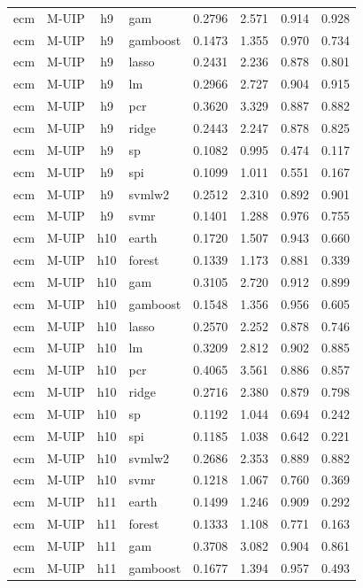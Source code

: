 \begin{ThreePartTable}
\begin{longtable}[t]{llclcccc}
ecm & M-UIP & h9 & gam & 0.2796 & 2.571 & 0.914 & 0.928\\
ecm & M-UIP & h9 & gamboost & 0.1473 & 1.355 & 0.970 & 0.734\\
ecm & M-UIP & h9 & lasso & 0.2431 & 2.236 & 0.878 & 0.801\\
ecm & M-UIP & h9 & lm & 0.2966 & 2.727 & 0.904 & 0.915\\
ecm & M-UIP & h9 & pcr & 0.3620 & 3.329 & 0.887 & 0.882\\
ecm & M-UIP & h9 & ridge & 0.2443 & 2.247 & 0.878 & 0.825\\
ecm & M-UIP & h9 & sp & 0.1082 & 0.995 & 0.474 & 0.117\\
ecm & M-UIP & h9 & spi & 0.1099 & 1.011 & 0.551 & 0.167\\
ecm & M-UIP & h9 & svmlw2 & 0.2512 & 2.310 & 0.892 & 0.901\\
ecm & M-UIP & h9 & svmr & 0.1401 & 1.288 & 0.976 & 0.755\\
\addlinespace
ecm & M-UIP & h10 & earth & 0.1720 & 1.507 & 0.943 & 0.660\\
ecm & M-UIP & h10 & forest & 0.1339 & 1.173 & 0.881 & 0.339\\
ecm & M-UIP & h10 & gam & 0.3105 & 2.720 & 0.912 & 0.899\\
ecm & M-UIP & h10 & gamboost & 0.1548 & 1.356 & 0.956 & 0.605\\
ecm & M-UIP & h10 & lasso & 0.2570 & 2.252 & 0.878 & 0.746\\
ecm & M-UIP & h10 & lm & 0.3209 & 2.812 & 0.902 & 0.885\\
ecm & M-UIP & h10 & pcr & 0.4065 & 3.561 & 0.886 & 0.857\\
ecm & M-UIP & h10 & ridge & 0.2716 & 2.380 & 0.879 & 0.798\\
ecm & M-UIP & h10 & sp & 0.1192 & 1.044 & 0.694 & 0.242\\
ecm & M-UIP & h10 & spi & 0.1185 & 1.038 & 0.642 & 0.221\\
ecm & M-UIP & h10 & svmlw2 & 0.2686 & 2.353 & 0.889 & 0.882\\
ecm & M-UIP & h10 & svmr & 0.1218 & 1.067 & 0.760 & 0.369\\
\addlinespace
ecm & M-UIP & h11 & earth & 0.1499 & 1.246 & 0.909 & 0.292\\
ecm & M-UIP & h11 & forest & 0.1333 & 1.108 & 0.771 & 0.163\\
ecm & M-UIP & h11 & gam & 0.3708 & 3.082 & 0.904 & 0.861\\
ecm & M-UIP & h11 & gamboost & 0.1677 & 1.394 & 0.957 & 0.493\\

\end{longtable}
\end{ThreePartTable}
